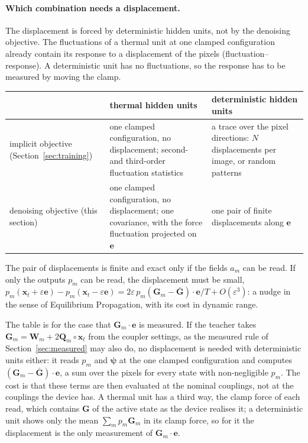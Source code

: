 \documentclass[11pt,a4paper]{article}
\newcommand{\vx}{\bm{x}}
\begin{document}
\paragraph{Which combination needs a displacement.} The displacement is forced by deterministic hidden units, not
by the denoising objective. The fluctuations of a thermal unit at one clamped configuration already contain its
response to a displacement of the pixels (fluctuation--response). A deterministic unit has no fluctuations, so the
response has to be measured by moving the clamp.
\begin{center}
\begin{tabular}{p{3.0cm}p{5.7cm}p{5.7cm}}
\toprule
 & thermal hidden units & deterministic hidden units\\
\midrule
implicit objective (Section~\ref{sec:training}) & one clamped configuration, no displacement; second- and
  third-order fluctuation statistics & a trace over the pixel directions: $N$ displacements per image, or random
  patterns\\[4pt]
denoising objective (this section) & one clamped configuration, no displacement; one covariance, with the force
  fluctuation projected on $\bm e$ & one pair of finite displacements along $\bm e$\\
\bottomrule
\end{tabular}
\end{center}
The pair of displacements is finite and exact only if the fields $a_m$ can be read. If only the outputs $p_m$ can be
read, the displacement must be small,
$p_m(\vx_t+\varepsilon\bm e)-p_m(\vx_t-\varepsilon\bm e)=2\varepsilon\,p_m(\bm G_m-\bar{\bm G})\cdot\bm e/T+O(\varepsilon^3)$:
a nudge in the sense of Equilibrium Propagation, with its cost in dynamic range.

The table is for the case that $\bm G_m\cdot\bm e$ is measured. If the teacher takes $\bm G_m=\bm W_m+2\bm
Q_m\circ\vx_t$ from the coupler settings, as the measured rule of Section~\ref{sec:measured} may also do, no
displacement is needed with deterministic units either: it reads $p_m$ and $\bm\psi$ at the one clamped
configuration and computes $(\bm G_m-\bar{\bm G})\cdot\bm e$, a sum over the pixels for every state with
non-negligible $p_m$. The cost is that these terms are then evaluated at the nominal couplings, not at the
couplings the device has. A thermal unit has a third way, the clamp force of each read, which contains $\bm G$ of
the active state as the device realises it; a deterministic unit shows only the mean $\sum_mp_m\bm G_m$ in its
clamp force, so for it the displacement is the only measurement of $\bm G_m\cdot\bm e$.
\end{document}
